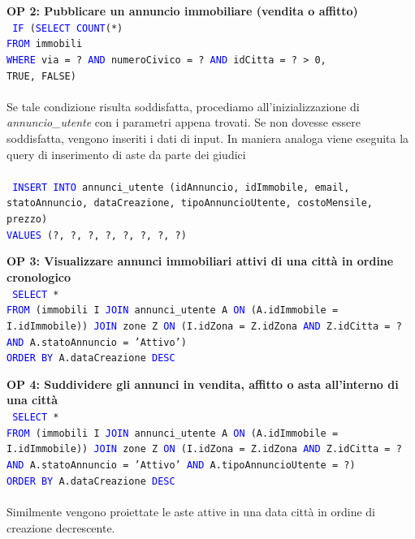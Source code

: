 \documentclass[a4paper,12pt]{report}
\begin{document}
            \noindent
            \textbf{OP 2: Pubblicare un annuncio immobiliare (vendita o affitto)} \\
            \texttt{
                \textcolor{blue}{IF} (\textcolor{blue}{SELECT} \textcolor{blue}{COUNT}(*) \\
                \null\quad\quad\textcolor{blue}{FROM} immobili \\
                \null\quad\quad\textcolor{blue}{WHERE} via = ? \textcolor{blue}{AND} numeroCivico = ? \textcolor{blue}{AND} idCitta = ? > 0, \\
                \null\quad\quad TRUE, FALSE)  \\
            } \\
            Se tale condizione risulta soddisfatta, procediamo all'inizializzazione di \textit{annuncio\_utente} con i
            parametri appena trovati. Se non dovesse essere soddisfatta, vengono inseriti i dati di input. 
            In maniera analoga viene eseguita la query di inserimento di aste da parte dei giudici \\ \\
            \texttt{
                \textcolor{blue}{INSERT INTO} annunci\_utente (idAnnuncio, idImmobile, email, statoAnnuncio, dataCreazione, tipoAnnuncioUtente, costoMensile, prezzo) \\
                \textcolor{blue}{VALUES} (?, ?, ?, ?, ?, ?, ?, ?) \\
            }

            \noindent
            \textbf{OP 3: Visualizzare annunci immobiliari attivi di una città in ordine cronologico} \\
            \texttt{
                \textcolor{blue}{SELECT} * \\
                \textcolor{blue}{FROM} (immobili I \textcolor{blue}{JOIN} annunci\_utente A \textcolor{blue}{ON} (A.idImmobile = I.idImmobile)) \textcolor{blue}{JOIN} zone Z \textcolor{blue}{ON} (I.idZona = Z.idZona \textcolor{blue}{AND} Z.idCitta = ? \textcolor{blue}{AND} A.statoAnnuncio = 'Attivo') \\
                \textcolor{blue}{ORDER BY} A.dataCreazione  \textcolor{blue}{DESC} \\
            }

            \noindent
            \textbf{OP 4: Suddividere gli annunci in vendita, affitto o asta all’interno di una città} \\
            \texttt{
                \textcolor{blue}{SELECT} * \\
                \textcolor{blue}{FROM} (immobili I \textcolor{blue}{JOIN} annunci\_utente A \textcolor{blue}{ON} (A.idImmobile = I.idImmobile)) \textcolor{blue}{JOIN} zone Z \textcolor{blue}{ON} (I.idZona = Z.idZona \textcolor{blue}{AND} Z.idCitta = ? \textcolor{blue}{AND} A.statoAnnuncio = 'Attivo' \textcolor{blue}{AND} A.tipoAnnuncioUtente = ?) \\
                \textcolor{blue}{ORDER BY} A.dataCreazione  \textcolor{blue}{DESC} \\
            }
            \\
            Similmente vengono proiettate le aste attive in una data città in ordine di creazione decrescente.\\
\end{document}
